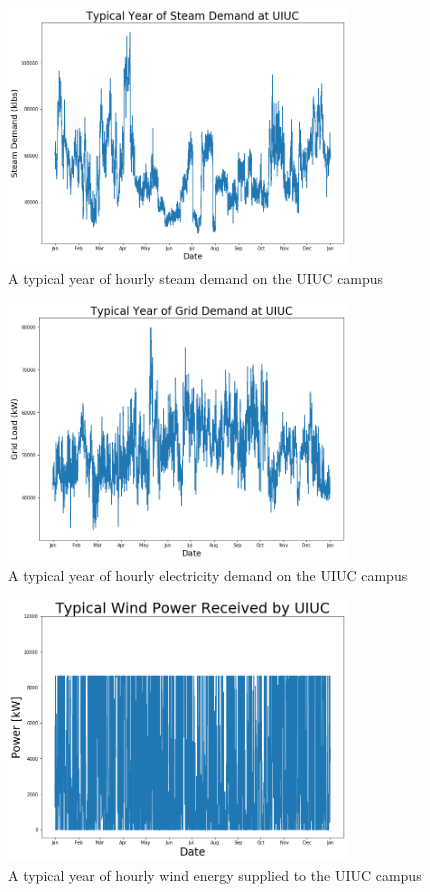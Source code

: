 \begin{figure}
  \centering
  \includegraphics[width=0.8\textwidth]{typicalsteam}
  \caption{A typical year of hourly steam demand on the UIUC campus}
  \label{fig:typstm}
\end{figure}

\begin{figure}
  \centering
  \includegraphics[width=0.8\textwidth]{typicaldemand}
  \caption{A typical year of hourly electricity demand on the UIUC campus}
  \label{fig:typelc}
\end{figure}

\begin{figure}
  \centering
  \includegraphics[width=0.8\textwidth]{typicalwind}
  \caption{A typical year of hourly wind energy supplied to the UIUC campus}
  \label{fig:typwind}
\end{figure}

